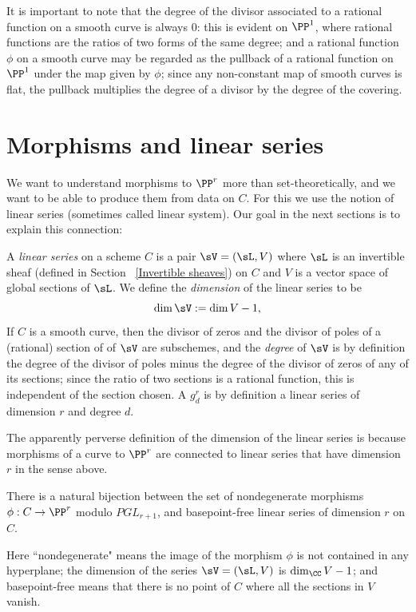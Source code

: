 It is important to note that the degree of the divisor associated to a rational function on a smooth curve is always 0: this is evident on $\PP^1$, where rational 
functions are the ratios of two forms of the same degree; and a rational function $\phi$ on a smooth curve may be regarded as the pullback of a rational function
on $\PP^1$ under the map given by $\phi$; since any non-constant map of smooth curves is flat, the pullback multiplies the degree of a divisor by the degree 
of the covering. 

\section{Morphisms and linear series}
We want to understand morphisms to $\PP^r$ more than set-theoretically, and we want to be able to produce them from data on $C$. For this we use the notion of linear series (sometimes called linear system). Our goal in the next sections is to explain this connection:

\begin{definition}
 A \emph{linear series} on a scheme $C$ is a pair $\sV  = (\sL, V)$ where $\sL$ is an invertible sheaf (defined in Section ~\ref{Invertible sheaves}) on $C$ and
 $V$ is a vector space of global sections of $\sL$. We define the \emph{dimension} of the linear series to be 
 $$
 \dim \sV := \dim V -1,
 $$
 If $C$ is a smooth curve, then the divisor of zeros and the divisor of poles of a (rational) section of of $\sV$ are subschemes, and the \emph{degree} of $\sV$ is by definition the degree of the divisor of poles minus the degree of the divisor of zeros of any of its sections; since the 
 ratio of two sections is a rational function, this is independent of the section chosen. A $g^r_d$ is by definition a linear series
 of dimension $r$ and degree $d$.
\end{definition}

The apparently perverse definition of the dimension of the linear series is because morphisms of a curve to $\PP^r$ are connected to linear series that have dimension $r$ in the sense above.

\begin{theorem}\label{morphisms and linear series}
There is a natural bijection between the set of nondegenerate morphisms $\phi : C \to \PP^r$ modulo $PGL_{r+1}$, and basepoint-free linear series of dimension $r$ on $C$.\end{theorem}

Here ``nondegenerate" means the image of the morphism $\phi$ is not contained in any hyperplane; the dimension of the series
 $\sV  = (\sL, V)$ is $\dim_\CC V -1$; and basepoint-free means that there is no point of $C$ where all the sections in $V$
vanish.


